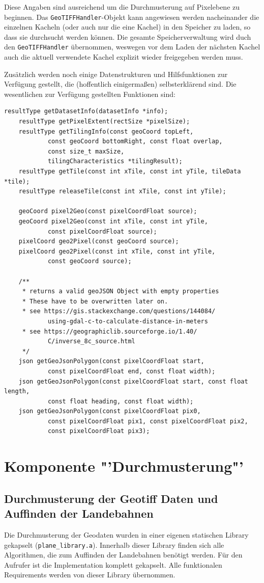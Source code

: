 \documentclass[10pt,a4paper]{report}
\begin{document}
Diese Angaben sind ausreichend um die Durchmusterung auf Pixelebene zu beginnen. Das \texttt{GeoTIFFHandler}-Objekt kann angewiesen werden nacheinander die einzelnen Kacheln (oder auch nur die eine Kachel) in den Speicher zu laden, so dass sie durchsucht werden können. Die gesamte Speicherverwaltung wird duch den \texttt{GeoTIFFHandler} übernommen, weswegen vor dem Laden der nächsten Kachel auch die aktuell verwendete Kachel explizit wieder freigegeben werden muss.

Zusätzlich werden noch einige Datenstrukturen und Hilfsfunktionen zur Verfügung gestellt, die (hoffentlich einigermaßen) selbsterklärend sind.
Die wesentlichen zur Verfügung gestellten Funktionen sind:
\begin{lstlisting}[language=myC]
	resultType getDatasetInfo(datasetInfo *info);
	resultType getPixelExtent(rectSize *pixelSize);
	resultType getTilingInfo(const geoCoord topLeft, 
			const geoCoord bottomRight, const float overlap, 
			const size_t maxSize, 
			tilingCharacteristics *tilingResult);
	resultType getTile(const int xTile, const int yTile, tileData *tile);
	resultType releaseTile(const int xTile, const int yTile);

	geoCoord pixel2Geo(const pixelCoordFloat source);
	geoCoord pixel2Geo(const int xTile, const int yTile, 
			const pixelCoordFloat source);
	pixelCoord geo2Pixel(const geoCoord source);
	pixelCoord geo2Pixel(const int xTile, const int yTile, 
			const geoCoord source);

	/**
	 * returns a valid geoJSON Object with empty properties
	 * These have to be overwritten later on.
	 * see https://gis.stackexchange.com/questions/144084/
	 		using-gdal-c-to-calculate-distance-in-meters
	 * see https://geographiclib.sourceforge.io/1.40/
	 		C/inverse_8c_source.html
	 */
	json getGeoJsonPolygon(const pixelCoordFloat start, 
			const pixelCoordFloat end, const float width);
	json getGeoJsonPolygon(const pixelCoordFloat start, const float length, 
			const float heading, const float width);
	json getGeoJsonPolygon(const pixelCoordFloat pix0, 
			const pixelCoordFloat pix1, const pixelCoordFloat pix2, 
			const pixelCoordFloat pix3);
\end{lstlisting}

\chapter{Komponente "'Durchmusterung"'}
\section{Durchmusterung der Geotiff Daten und Auffinden der Landebahnen}
Die Durchmusterung der Geodaten wurden in einer eigenen statischen Library gekapselt (\texttt{plane\_library.a}). Innerhalb dieser Library finden sich alle Algorithmen, die zum Auffinden der Landebahnen benötigt werden. Für den Aufrufer ist die Implementation komplett gekapselt. Alle funktionalen Requirements werden von dieser Library übernommen.
\end{document}
